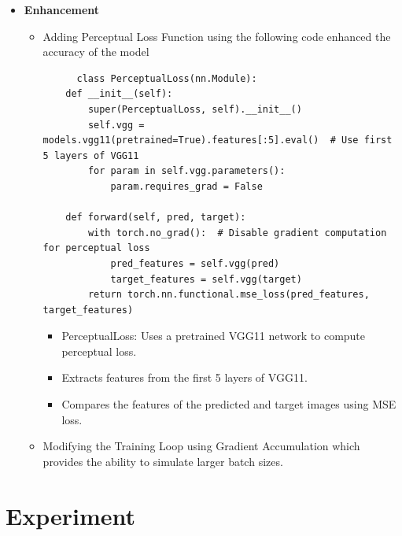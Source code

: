\documentclass[conference]{IEEEtran}
\begin{document}
\begin{itemize}
\item \textbf{Enhancement}
\begin{itemize}
    \item Adding Perceptual Loss Function using the following code enhanced the accuracy of the model
    \begin{lstlisting}
      class PerceptualLoss(nn.Module):
    def __init__(self):
        super(PerceptualLoss, self).__init__()
        self.vgg = models.vgg11(pretrained=True).features[:5].eval()  # Use first 5 layers of VGG11
        for param in self.vgg.parameters():
            param.requires_grad = False

    def forward(self, pred, target):
        with torch.no_grad():  # Disable gradient computation for perceptual loss
            pred_features = self.vgg(pred)
            target_features = self.vgg(target)
        return torch.nn.functional.mse_loss(pred_features, target_features)  
    \end{lstlisting}
    \begin{itemize} 
    \item PerceptualLoss: Uses a pretrained VGG11 network to compute perceptual loss.
    \item Extracts features from the first 5 layers of VGG11.
    \item Compares the features of the predicted and target images using MSE loss.
    \end{itemize}

    \item Modifying the Training Loop using Gradient Accumulation which provides the ability to simulate larger batch sizes.
    
\end{itemize}

\end{itemize}

 \section{Experiment}
\end{document}
